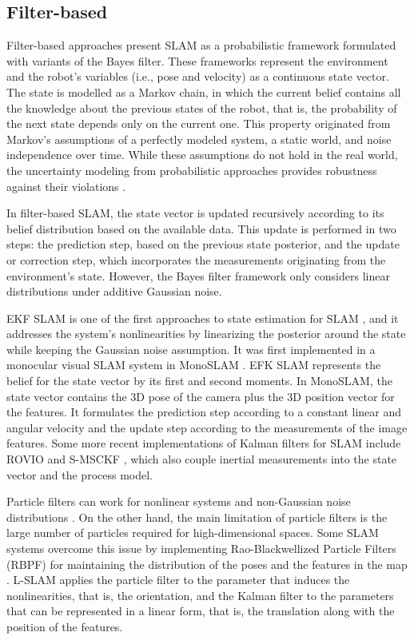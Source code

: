 \subsection{Filter-based}
\label{sec:backend:filterbased}

Filter-based approaches present SLAM as a probabilistic framework formulated with variants of the Bayes filter. These frameworks represent the environment and the robot's variables (i.e., pose and velocity) as a continuous state vector. The state is modelled as a Markov chain, in which the current belief contains all the knowledge about the previous states of the robot, that is, the probability of the next state depends only on the current one. This property originated from Markov's assumptions of a perfectly modeled system, a static world, and noise independence over time. While these assumptions do not hold in the real world, the uncertainty modeling from probabilistic approaches provides robustness against their violations \cite{probroboticsthrun}. 

In filter-based SLAM, the state vector is updated recursively according to its belief distribution based on the available data. This update is performed in two steps: the prediction step, based on the previous state posterior, and the update or correction step, which incorporates the measurements originating from the environment's state. However, the Bayes filter framework only considers linear distributions under additive Gaussian noise.


\ac{EKF} SLAM is one of the first approaches to state estimation for SLAM \cite{probroboticsthrun}, and it addresses the system's nonlinearities by linearizing the posterior around the state while keeping the Gaussian noise assumption.  
It was first implemented in a monocular visual SLAM system in MonoSLAM \cite{davison2007monoslam}. EFK SLAM represents the belief for the state vector by its first and second moments. In MonoSLAM, the state vector contains the 3D pose of the camera plus the 3D position vector for the features. It formulates the prediction step according to a constant linear and angular velocity and the update step according to the measurements of the image features. Some more recent implementations of Kalman filters for SLAM include ROVIO \cite{bloesch2015rovio} and S-MSCKF \cite{sun2018s-msckf}, which also couple inertial measurements into the state vector and the process model.
    
Particle filters can work for nonlinear systems and non-Gaussian noise distributions \cite{pupilli2005realtctpf}. On the other hand, the main limitation of particle filters is the large number of particles required for high-dimensional spaces. Some SLAM systems overcome this issue by implementing Rao-Blackwellized Particle Filters (RBPF) for maintaining the distribution of the poses and the features in the map \cite{huletski2015modernevaluation}. L-SLAM \cite{zikos20156L-SLAM} applies the particle filter to the parameter that induces the nonlinearities, that is, the orientation, and the Kalman filter to the parameters that can be represented in a linear form, that is, the translation along with the position of the features.


